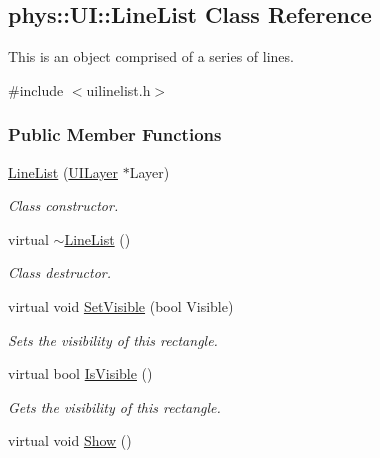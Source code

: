\hypertarget{classphys_1_1UI_1_1LineList}{
\subsection{phys::UI::LineList Class Reference}
\label{d7/de8/classphys_1_1UI_1_1LineList}
}


This is an object comprised of a series of lines.  




{\ttfamily \#include $<$uilinelist.h$>$}

\subsubsection*{Public Member Functions}
\begin{DoxyCompactItemize}
\item 
\hyperlink{classphys_1_1UI_1_1LineList_a0de86be9d9ecbd6f903cc15e6f44e135}{LineList} (\hyperlink{classphys_1_1UILayer}{UILayer} $\ast$Layer)
\begin{DoxyCompactList}\small\item\em Class constructor. \item\end{DoxyCompactList}\item 
\hypertarget{classphys_1_1UI_1_1LineList_ae962ca10492137ed85f7b66a79d4887e}{
virtual \hyperlink{classphys_1_1UI_1_1LineList_ae962ca10492137ed85f7b66a79d4887e}{$\sim$LineList} ()}
\label{d7/de8/classphys_1_1UI_1_1LineList_ae962ca10492137ed85f7b66a79d4887e}

\begin{DoxyCompactList}\small\item\em Class destructor. \item\end{DoxyCompactList}\item 
virtual void \hyperlink{classphys_1_1UI_1_1LineList_acecf11c133825233afd73d55ba9e4c1d}{SetVisible} (bool Visible)
\begin{DoxyCompactList}\small\item\em Sets the visibility of this rectangle. \item\end{DoxyCompactList}\item 
virtual bool \hyperlink{classphys_1_1UI_1_1LineList_af8c50f2e60b5a087cc9f3a280e10bd72}{IsVisible} ()
\begin{DoxyCompactList}\small\item\em Gets the visibility of this rectangle. \item\end{DoxyCompactList}\item 
\hypertarget{classphys_1_1UI_1_1LineList_ae725a770a9b938d01f1a161be050fcc5}{
virtual void \hyperlink{classphys_1_1UI_1_1LineList_ae725a770a9b938d01f1a161be050fcc5}{Show} ()}
\label{d7/de8/classphys_1_1UI_1_1LineList_ae725a770a9b938d01f1a161be050fcc5}


\end{DoxyCompactItemize}
